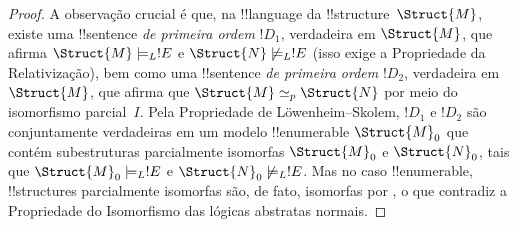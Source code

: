 \documentclass[../../../include/open-logic-section]{subfiles}
\begin{document}
\begin{proof}
A observação crucial é que, na !!{language} da
!!{structure}~$\Struct{M}$, existe uma !!{sentence} \emph{de primeira
  ordem} $!D_1$, verdadeira em $\Struct{M}$, que afirma
$\Struct{M} \models_L !E$ e $\Struct{N} \not\models_L !E$ (isso exige
a Propriedade da Relativização), bem como uma !!{sentence}
\emph{de primeira ordem} $!D_2$, verdadeira em $\Struct{M}$, que
afirma que $\Struct{M} \simeq_p \Struct{N}$ por meio do isomorfismo
parcial~$I$. Pela Propriedade de L\"owenheim--Skolem, $!D_1$ e $!D_2$
são conjuntamente verdadeiras em um modelo !!{enumerable}
$\Struct{M}_0$ que contém subestruturas parcialmente isomorfas
$\Struct{M}_0$ e $\Struct{N}_0$, tais que
$\Struct{M}_0 \models_L !E$ e $\Struct{N}_0 \not\models_L !E$. Mas
no caso !!{enumerable}, !!{structure}s parcialmente isomorfas são, de fato,
isomorfas por , o que contradiz a
Propriedade do Isomorfismo das lógicas abstratas normais.
\end{proof}
\end{document}
